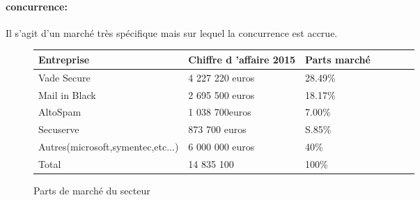 \paragraph{concurrence:}
Il s’agit d’un marché très spécifique mais sur lequel la concurrence est accrue.\\

\begin{figure}[!h]
\begin{center}
\begin{tabular}{|l|l|l|l|c|l|l|}
  \hline
 Entreprise & Chiffre d 'affaire 2015& Parts marché\\
  \hline
   Vade Secure& 4 227 220 euros & 28.49\% \\
   \hline
  Mail in Black& 2 695 500 euros & 18.17\% \\
  \hline
  AltoSpam& 1 038 700euros & 7.00\% \\
  \hline  
   \rowcolor{orange}Secuserve& 873 700 euros& S.85\% \\
	\hline
   Autres(microsoft,symentec,etc...)& 6 000 000 euros & 40\%\\
	\hline  
    Total& 14 835 100 & 100\% \\
  \hline
\end{tabular}
\end{center}
\caption{Parts de marché du secteur}
\end{figure}

